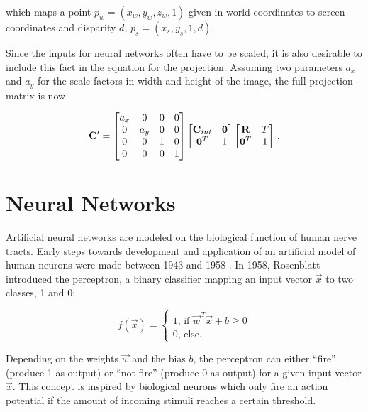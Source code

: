 			which maps a point $p_w = \left(x_w, y_w, z_w, 1\right)$ given in world coordinates to screen coordinates and disparity $d$, $p_s = \left(x_s, y_s, 1, d\right)$.
			
			Since the inputs for neural networks often have to be scaled, it is also desirable to include this fact in the equation for the projection. Assuming two parameters $a_x$ and $a_y$ for the scale factors in width and height of the image, the full projection matrix is now
			
			\begin{equation}
			\mathbf{C}' = \begin{bmatrix}a_x & 0 & 0 & 0\\ 0 & a_y & 0 & 0\\0 & 0 & 1 & 0\\0 & 0 & 0 & 1\end{bmatrix} \begin{bmatrix}\mathbf{C}_{int} & \mathbf{0}\\\mathbf{0}^T & 1\end{bmatrix}
			\begin{bmatrix}\mathbf{R} & T\\\mathbf{0}^T & 1\end{bmatrix} \,.
			\end{equation}
		
\section { Neural Networks }
	Artificial neural networks 	are modeled on the biological function of human nerve tracts. Early steps towards development and application of an artificial model of human neurons were made between 1943 and 1958 \cite{McCulloch1943, ROSENBLATT1958}. In 1958, Rosenblatt introduced the perceptron, a binary classifier mapping an input vector $\vec{x}$ to two classes, 1 and 0:
	
	\begin{equation}
	\label{eq:rosenblatt-perceptron}
	f(\vec{x}) =
	\begin{cases}
	1\text{, if } \vec{w}^{\,T}\vec{x} + b \geq 0 \\
	0\text{, else.}
	\end{cases}
	\end{equation}
	
	Depending on the weights $\vec{w}$ and the bias $b$, the perceptron can either "`fire"' (produce 1 as output) or "`not fire"' (produce 0 as output) for a given input vector $\vec{x}$. This concept is inspired by biological neurons which only fire an action potential if the amount of incoming stimuli reaches a certain threshold.
	
